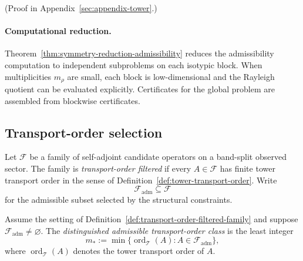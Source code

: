 (Proof in Appendix~\ref{sec:appendix-tower}.)

\paragraph{Computational reduction.}
\label{rem:symmetry-computational-reduction}
Theorem~\ref{thm:symmetry-reduction-admissibility} reduces the admissibility computation to independent subproblems on each isotypic block.
When multiplicities $m_\rho$ are small, each block is low-dimensional and the Rayleigh quotient can be evaluated explicitly.
Certificates for the global problem are assembled from blockwise certificates.

\subsection{Transport-order selection}
\label{subsec:transport-order-selection}

\begin{definition}
\label{def:transport-order-filtered-family}
Let $\mathcal F$ be a family of self-adjoint candidate operators on a
band-split observed sector. The family is \emph{transport-order filtered} if
every $A\in\mathcal F$ has finite tower transport order in the sense of
Definition~\ref{def:tower-transport-order}. Write
\[
\mathcal F_{\mathrm{adm}}\subseteq \mathcal F
\]
for the admissible subset selected by the structural constraints.
\end{definition}

\begin{definition}
\label{def:distinguished-transport-order-class}
Assume the setting of Definition~\ref{def:transport-order-filtered-family} and
suppose $\mathcal F_{\mathrm{adm}}\neq\varnothing$. The
\emph{distinguished admissible transport-order class} is the least integer
\[
m_\ast:=\min\{\operatorname{ord}_{\mathcal T}(A):A\in\mathcal F_{\mathrm{adm}}\},
\]
where $\operatorname{ord}_{\mathcal T}(A)$ denotes the tower transport order
of $A$.
\end{definition}

